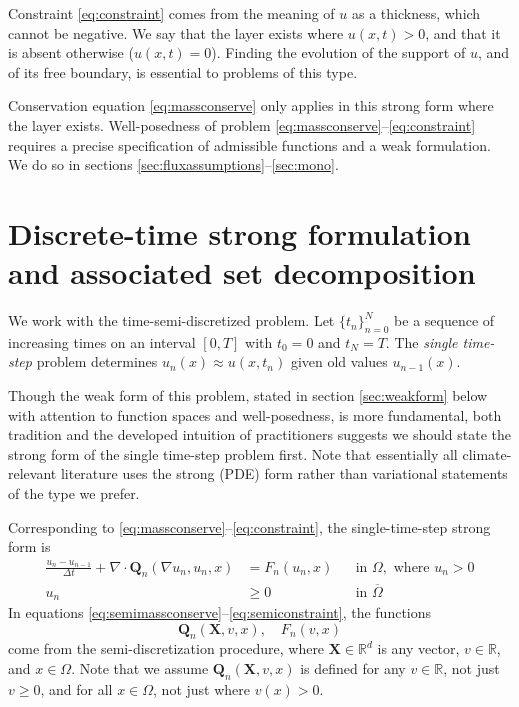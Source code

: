 \documentclass[final,leqno,onefignum,onetabnum]{siamltex1213bueler}
\newcommand\bQ{\mathbf{Q}}
\newcommand\bX{\mathbf{X}}
\newcommand{\Div}{\nabla\cdot}
\renewcommand{\grad}{\nabla}
\newcommand\RR{\mathbb{R}}
\begin{document}
Constraint \eqref{eq:constraint} comes from the meaning of $u$ as a thickness, which cannot be negative.  We say that the layer exists where $u(x,t)>0$, and that it is absent otherwise ($u(x,t)=0$).  Finding the evolution of the support of $u$, and of its free boundary, is essential to problems of this type.

Conservation equation \eqref{eq:massconserve} only applies in this strong form where the layer exists.  Well-posedness of problem \eqref{eq:massconserve}--\eqref{eq:constraint} requires a precise specification of admissible functions and a weak formulation.  We do so in sections \ref{sec:fluxassumptions}--\ref{sec:mono}.

\section{Discrete-time strong formulation and associated set decomposition}  \label{sec:discreteform}

We work with the time-semi-discretized problem.  Let $\{t_n\}_{n=0}^N$ be a sequence of increasing times on an interval $[0,T]$ with $t_0=0$ and $t_N=T$.  The \emph{single time-step} problem determines $u_n(x) \approx u(x,t_n)$ given old values $u_{n-1}(x)$.

Though the weak form of this problem, stated in section \ref{sec:weakform} below with attention to function spaces and well-posedness, is more fundamental, both tradition and the developed intuition of practitioners suggests we should state the strong form of the single time-step problem first.  Note that essentially all climate-relevant literature uses the strong (PDE) form rather than variational statements of the type we prefer.

Corresponding to \eqref{eq:massconserve}--\eqref{eq:constraint}, the single-time-step strong form is
\begin{align}
\frac{u_n - u_{n-1}}{\Delta t} + \Div \bQ_n(\grad u_n,u_n,x) &= F_n(u_n,x) &&\text{in } \Omega, \text{ where } u_n > 0 \label{eq:semimassconserve} \\
u_n &\ge 0 &&\text{in } \overline{\Omega} \label{eq:semiconstraint}
\end{align}
In equations \eqref{eq:semimassconserve}--\eqref{eq:semiconstraint}, the functions
\begin{equation}
\bQ_n(\bX,v,x), \quad F_n(v,x) \label{eq:functionalforms}
\end{equation}
come from the semi-discretization procedure, where $\bX\in\RR^d$ is any vector, $v\in\RR$, and $x\in \Omega$.  Note that we assume $\bQ_n(\bX,v,x)$ is defined for any $v\in\RR$, not just $v\ge 0$, and for all $x\in\Omega$, not just where $v(x)>0$.
\end{document}
